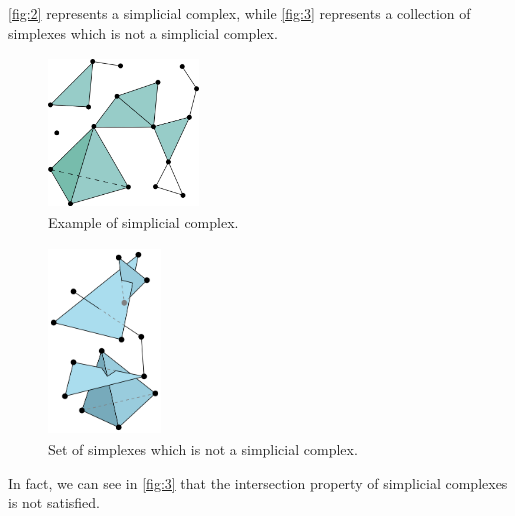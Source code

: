 \documentclass[../1.tex]{subfiles}
\begin{document}
    \autoref{fig:2} represents a simplicial complex, while \autoref{fig:3} represents a collection of simplexes which is not a simplicial complex. 

    
    \begin{figure}[H]
        \centering
        \includegraphics[width=4cm, height=4cm]{sections/1/complex}
        \caption{Example of simplicial complex.}
        \label{fig:2}
    \end{figure} 

    \begin{figure}[H]
        \centering
        \includegraphics[width=3cm, height=5cm]{sections/1/noncomplex}
        \caption{Set of simplexes which is not a simplicial complex.}
        \label{fig:3}
    \end{figure}

    In fact, we can see in \autoref{fig:3} that the intersection property of simplicial complexes is not satisfied.
\end{document}
